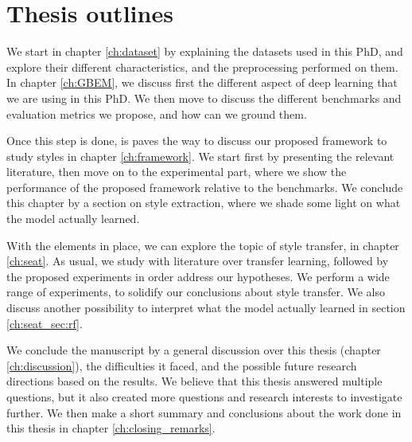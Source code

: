 %
%

\section{Thesis outlines}
\par We start in chapter \ref{ch:dataset} by explaining the datasets used in this PhD, and explore their different characteristics, and the preprocessing performed on them. In chapter \ref{ch:GBEM}, we discuss first the different aspect of deep learning that we are using in this PhD. We then move to discuss the different benchmarks and evaluation metrics we propose, and how can we ground them.

\par Once this step is done, is paves the way to discuss our proposed framework to study styles in chapter \ref{ch:framework}. We start first by presenting the relevant literature, then move on to the experimental part, where we show the performance of the proposed framework relative to the benchmarks. We conclude this chapter by a section on style extraction, where we shade some light on what the model actually learned.

\par With the elements in place, we can explore the topic of style transfer, in chapter \ref{ch:seat}. As usual, we study with literature over transfer learning, followed by the proposed experiments in order address our hypotheses. We perform a wide range of experiments, to solidify our conclusions about style transfer. We also discuss another possibility to interpret what the model actually learned in section \ref{ch:seat_sec:rf}.

\par We conclude the manuscript by a general discussion over this thesis (chapter \ref{ch:discussion}), the difficulties it faced, and the possible future research directions based on the results. We believe that this thesis answered multiple questions, but it also created more questions and research interests to investigate further. We then make a short summary and conclusions about the work done in this thesis in chapter \ref{ch:closing_remarks}.
